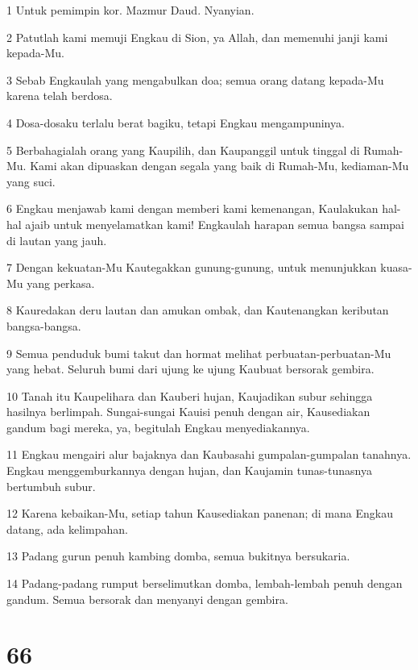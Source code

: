 \par 1 Untuk pemimpin kor. Mazmur Daud. Nyanyian.
\par 2 Patutlah kami memuji Engkau di Sion, ya Allah, dan memenuhi janji kami kepada-Mu.
\par 3 Sebab Engkaulah yang mengabulkan doa; semua orang datang kepada-Mu karena telah berdosa.
\par 4 Dosa-dosaku terlalu berat bagiku, tetapi Engkau mengampuninya.
\par 5 Berbahagialah orang yang Kaupilih, dan Kaupanggil untuk tinggal di Rumah-Mu. Kami akan dipuaskan dengan segala yang baik di Rumah-Mu, kediaman-Mu yang suci.
\par 6 Engkau menjawab kami dengan memberi kami kemenangan, Kaulakukan hal-hal ajaib untuk menyelamatkan kami! Engkaulah harapan semua bangsa sampai di lautan yang jauh.
\par 7 Dengan kekuatan-Mu Kautegakkan gunung-gunung, untuk menunjukkan kuasa-Mu yang perkasa.
\par 8 Kauredakan deru lautan dan amukan ombak, dan Kautenangkan keributan bangsa-bangsa.
\par 9 Semua penduduk bumi takut dan hormat melihat perbuatan-perbuatan-Mu yang hebat. Seluruh bumi dari ujung ke ujung Kaubuat bersorak gembira.
\par 10 Tanah itu Kaupelihara dan Kauberi hujan, Kaujadikan subur sehingga hasilnya berlimpah. Sungai-sungai Kauisi penuh dengan air, Kausediakan gandum bagi mereka, ya, begitulah Engkau menyediakannya.
\par 11 Engkau mengairi alur bajaknya dan Kaubasahi gumpalan-gumpalan tanahnya. Engkau menggemburkannya dengan hujan, dan Kaujamin tunas-tunasnya bertumbuh subur.
\par 12 Karena kebaikan-Mu, setiap tahun Kausediakan panenan; di mana Engkau datang, ada kelimpahan.
\par 13 Padang gurun penuh kambing domba, semua bukitnya bersukaria.
\par 14 Padang-padang rumput berselimutkan domba, lembah-lembah penuh dengan gandum. Semua bersorak dan menyanyi dengan gembira.

\chapter{66}


